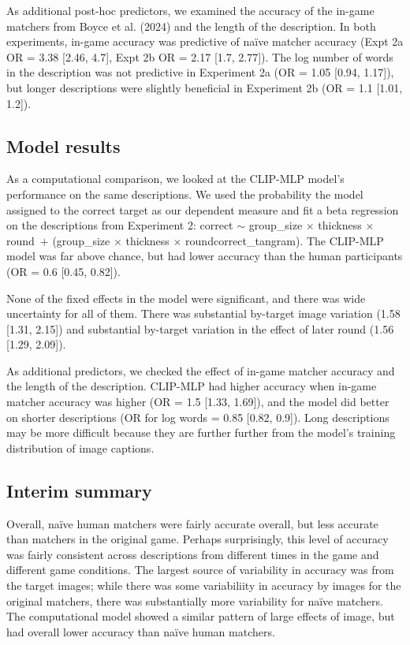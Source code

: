 \documentclass[10pt, letterpaper]{article}
\begin{document}
As additional post-hoc predictors, we examined the accuracy of the
in-game matchers from Boyce et al. (2024) and the length of the
description. In both experiments, in-game accuracy was predictive of
naïve matcher accuracy (Expt 2a OR = 3.38 {[}2.46, 4.7{]}, Expt 2b OR =
2.17 {[}1.7, 2.77{]}). The log number of words in the description was
not predictive in Experiment 2a (OR = 1.05 {[}0.94, 1.17{]}), but longer
descriptions were slightly beneficial in Experiment 2b (OR = 1.1
{[}1.01, 1.2{]}).

\subsection{Model results}\label{model-results}

As a computational comparison, we looked at the CLIP-MLP model's
performance on the same descriptions. We used the probability the model
assigned to the correct target as our dependent measure and fit a beta
regression on the descriptions from Experiment 2: correct \({\sim}\)
group\_size \({\times}\) thickness \({\times}\) round~\({+}\)
(group\_size \({\times}\) thickness \({\times}\)
round\textbar correct\_tangram). The CLIP-MLP model was far above
chance, but had lower accuracy than the human participants (OR = 0.6
{[}0.45, 0.82{]}).

None of the fixed effects in the model were significant, and there was
wide uncertainty for all of them. There was substantial by-target image
variation (1.58 {[}1.31, 2.15{]}) and substantial by-target variation in
the effect of later round (1.56 {[}1.29, 2.09{]}).

As additional predictors, we checked the effect of in-game matcher
accuracy and the length of the description. CLIP-MLP had higher accuracy
when in-game matcher accuracy was higher (OR = 1.5 {[}1.33, 1.69{]}),
and the model did better on shorter descriptions (OR for log words =
0.85 {[}0.82, 0.9{]}). Long descriptions may be more difficult because
they are further further from the model's training distribution of image
captions.

\subsection{Interim summary}\label{interim-summary}

Overall, naïve human matchers were fairly accurate overall, but less
accurate than matchers in the original game. Perhaps surprisingly, this
level of accuracy was fairly consistent across descriptions from
different times in the game and different game conditions. The largest
source of variability in accuracy was from the target images; while
there was some variabiliity in accuracy by images for the original
matchers, there was substantially more variability for naïve matchers.
The computational model showed a similar pattern of large effects of
image, but had overall lower accuracy than naïve human matchers.
\end{document}
